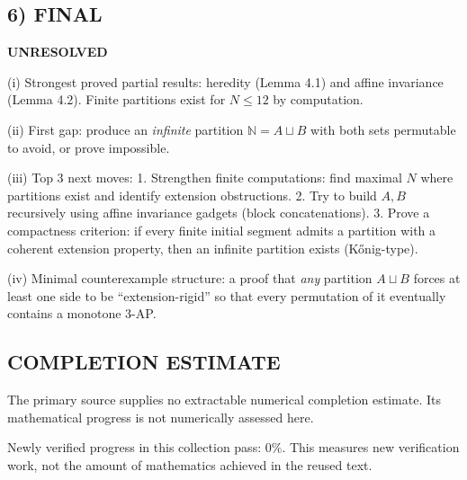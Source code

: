\subsection*{6) FINAL}
\textbf{UNRESOLVED}

(i) Strongest proved partial results: heredity (Lemma 4.1) and affine invariance (Lemma 4.2).
Finite partitions exist for $N\le 12$ by computation.

(ii) First gap: produce an \emph{infinite} partition $\mathbb{N}=A\sqcup B$ with both sets permutable to avoid, or prove impossible.

(iii) Top 3 next moves:
1. Strengthen finite computations: find maximal $N$ where partitions exist and identify extension obstructions.
2. Try to build $A,B$ recursively using affine invariance gadgets (block concatenations).
3. Prove a compactness criterion: if every finite initial segment admits a partition with a coherent extension property, then an infinite partition exists (K\H{o}nig-type).

(iv) Minimal counterexample structure: a proof that \emph{any} partition $A\sqcup B$ forces at least one side to be ``extension-rigid'' so that
every permutation of it eventually contains a monotone 3-AP.



\subsection*{COMPLETION ESTIMATE}
The primary source supplies no extractable numerical completion estimate. Its mathematical progress is not numerically assessed here.

Newly verified progress in this collection pass: $0\%$. This measures new verification work, not the amount of mathematics achieved in the reused text.
